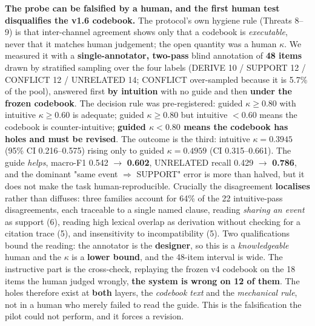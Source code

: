 \textbf{The probe can be falsified by a human, and the first human test disqualifies the v1.6 codebook.} The protocol's own hygiene rule (Threats 8--9) is that inter-channel agreement shows only that a codebook is \emph{executable}, never that it matches human judgement; the open quantity was a human $\kappa$. We measured it with a \textbf{single-annotator, two-pass} blind annotation of \textbf{48 items} drawn by stratified sampling over the four labels (DERIVE 10 / SUPPORT 12 / CONFLICT 12 / UNRELATED 14; CONFLICT over-sampled because it is 5.7\% of the pool), answered first \textbf{by intuition} with no guide and then \textbf{under the frozen codebook}. The decision rule was pre-registered: guided $\kappa\ge0.80$ with intuitive $\kappa\ge0.60$ is adequate; guided $\kappa\ge0.80$ but intuitive $<0.60$ means the codebook is counter-intuitive; \textbf{guided $\kappa<0.80$ means the codebook has holes and must be revised}. The outcome is the third: intuitive $\kappa=\mathbf{0.3945}$ (95\% CI 0.216--0.575) rising only to guided $\kappa=\mathbf{0.4959}$ (CI 0.315--0.661). The guide \emph{helps}, macro-F1 0.542 $\to$ \textbf{0.602}, UNRELATED recall 0.429 $\to$ \textbf{0.786}, and the dominant "same event $\Rightarrow$ SUPPORT" error is more than halved, but it does not make the task human-reproducible. Crucially the disagreement \textbf{localises} rather than diffuses: three families account for 64\% of the 22 intuitive-pass disagreements, each traceable to a single named clause, reading \emph{sharing an event} as support (6), reading high lexical overlap as derivation without checking for a citation trace (5), and insensitivity to incompatibility (5). Two qualifications bound the reading: the annotator is the \textbf{designer}, so this is a \emph{knowledgeable} human and the $\kappa$ is a \textbf{lower bound}, and the 48-item interval is wide. The instructive part is the cross-check, replaying the frozen v4 codebook on the 18 items the human judged wrongly, \textbf{the system is wrong on 12 of them}. The holes therefore exist at \textbf{both} layers, the \emph{codebook text} and the \emph{mechanical rule}, not in a human who merely failed to read the guide. This is the falsification the pilot could not perform, and it forces a revision.


